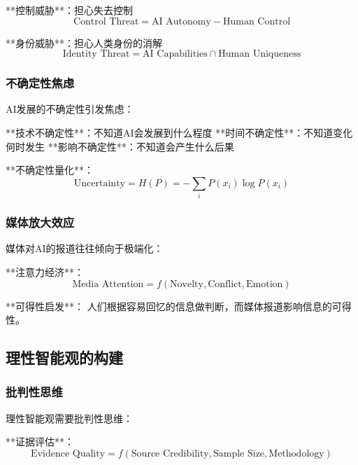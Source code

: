 **控制威胁**：担心失去控制
\begin{equation}
\text{Control Threat} = \text{AI Autonomy} - \text{Human Control}
\end{equation}

**身份威胁**：担心人类身份的消解
\begin{equation}
\text{Identity Threat} = \text{AI Capabilities} \cap \text{Human Uniqueness}
\end{equation}

\subsubsection{不确定性焦虑}

AI发展的不确定性引发焦虑：

**技术不确定性**：不知道AI会发展到什么程度
**时间不确定性**：不知道变化何时发生
**影响不确定性**：不知道会产生什么后果

**不确定性量化**：
\begin{equation}
\text{Uncertainty} = H(P) = -\sum_i P(x_i) \log P(x_i)
\end{equation}

\subsubsection{媒体放大效应}

媒体对AI的报道往往倾向于极端化：

**注意力经济**：
\begin{equation}
\text{Media Attention} = f(\text{Novelty}, \text{Conflict}, \text{Emotion})
\end{equation}

**可得性启发**：
人们根据容易回忆的信息做判断，而媒体报道影响信息的可得性。

\subsection{理性智能观的构建}

\subsubsection{批判性思维}

理性智能观需要批判性思维：

**证据评估**：
\begin{equation}
\text{Evidence Quality} = f(\text{Source Credibility}, \text{Sample Size}, \text{Methodology})
\end{equation}

